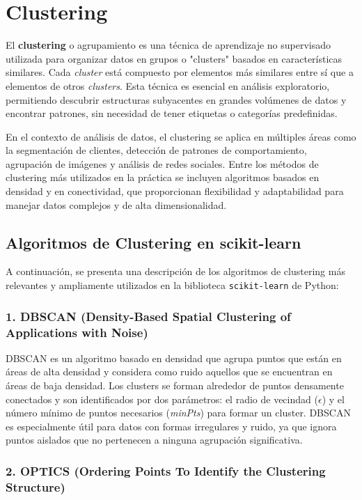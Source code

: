 \section{Clustering}

El \textbf{clustering} o agrupamiento es una técnica de aprendizaje no supervisado utilizada para organizar datos en grupos o "clusters" basados en características similares. Cada \textit{cluster} está compuesto por elementos más similares entre sí que a elementos de otros \textit{clusters}. Esta técnica es esencial en análisis exploratorio, permitiendo descubrir estructuras subyacentes en grandes volúmenes de datos y encontrar patrones, sin necesidad de tener etiquetas o categorías predefinidas.

En el contexto de análisis de datos, el clustering se aplica en múltiples áreas como la segmentación de clientes, detección de patrones de comportamiento, agrupación de imágenes y análisis de redes sociales. Entre los métodos de clustering más utilizados en la práctica se incluyen algoritmos basados en densidad y en conectividad, que proporcionan flexibilidad y adaptabilidad para manejar datos complejos y de alta dimensionalidad.

\subsection*{Algoritmos de Clustering en scikit-learn}

A continuación, se presenta una descripción de los algoritmos de clustering más relevantes y ampliamente utilizados en la biblioteca \texttt{scikit-learn} de Python:

\subsubsection*{1. DBSCAN (Density-Based Spatial Clustering of Applications with Noise)}

DBSCAN es un algoritmo basado en densidad que agrupa puntos que están en áreas de alta densidad y considera como ruido aquellos que se encuentran en áreas de baja densidad. Los clusters se forman alrededor de puntos densamente conectados y son identificados por dos parámetros: el radio de vecindad (\(\epsilon\)) y el número mínimo de puntos necesarios (\textit{minPts}) para formar un cluster. DBSCAN es especialmente útil para datos con formas irregulares y ruido, ya que ignora puntos aislados que no pertenecen a ninguna agrupación significativa.

\subsubsection*{2. OPTICS (Ordering Points To Identify the Clustering Structure)}

